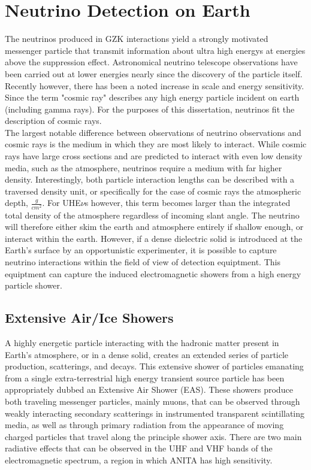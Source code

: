 \section{Neutrino Detection on Earth}
		  The neutrinos produced in GZK interactions yield a strongly motivated messenger particle that transmit information about ultra high energys at energies above the suppression effect.  Astronomical neutrino telescope observations have been carried out at lower energies nearly since the discovery of the particle itself. Recently however, there has been a noted increase in scale and energy sensitivity.  Since the term "cosmic ray" describes any high energy particle incident on earth (including gamma rays).  For the purposes of this dissertation, neutrinos fit the description of cosmic rays.  \\
		  The largest notable difference between observations of neutrino observations and cosmic rays is the medium in which they are most likely to interact.  While cosmic rays have large cross sections and are predicted to interact with even low density media, such as the atmosphere, neutrinos require a medium with far higher density.  Interestingly, both particle interaction lengths can be described with a traversed density unit, or specifically for the case of cosmic rays the atmospheric depth, $\frac{g}{cm^{2}}$.  For UHE$\nu$s however, this term becomes larger than the integrated total density of the atmosphere regardless of incoming slant angle.  The neutrino will therefore either skim the earth and atmosphere entirely if shallow enough, or interact within the earth.  However, if a dense dielectric solid is introduced at the Earth's surface by an opportunistic experimenter, it is possible to capture neutrino interactions within the field of view of detection equiptment.  This equiptment can capture the induced electromagnetic showers from a high energy particle shower.
		
	\subsection{Extensive Air/Ice Showers}
		A highly energetic particle interacting with the hadronic matter present in Earth's atmosphere, or in a dense solid, creates an extended series of particle production, scatterings, and decays.  This extensive shower of particles emanating from a single extra-terrestrial high energy transient source particle has been appropriately dubbed an Extensive Air Shower (EAS).  These showers produce both traveling messenger particles, mainly muons, that can be observed through weakly interacting secondary scatterings in instrumented transparent scintillating media, as well as through primary radiation from the appearance of moving charged particles that travel along the principle shower axis.  There are two main radiative effects that can be observed in the UHF and VHF bands of the electromagnetic spectrum, a region in which ANITA has high sensitivity.  
